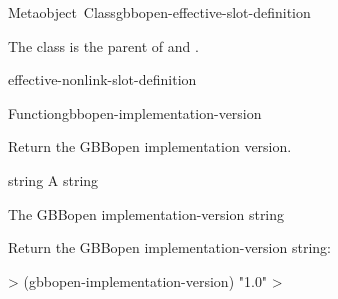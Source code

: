 \documentclass[10pt,twoside,english,pdftex]{article}
\begin{document}
\begin{functiondoc}{Metaobject~Class}{gbbopen-effective-slot-definition}{}
%

\fnsyntax

\fnpackage {}

\fnmodule {}

\fndescription The class  is
the parent  of
 and
.
 
\begin{alsos}{effective-nonlink-slot-definition}
\end{alsos}

\end{functiondoc}


\begin{functiondoc}{Function}{gbbopen-implementation-version}{\noargs{}
    \returns{} }
%
%

\fnsyntax

\fnpurpose Return the GBBopen implementation version.

\fnpackage {}

\fnmodule {}

\fnargs
\begin{args}{string}
\arg[string] A string
\end{args}

\fnreturns The GBBopen implementation-version string

\fnexample
Return the GBBopen implementation-version string:
%
\W\supp
\begin{example}
  > (gbbopen-implementation-version)
  "1.0"
  >
\end{example}

\end{functiondoc}

\end{document}
